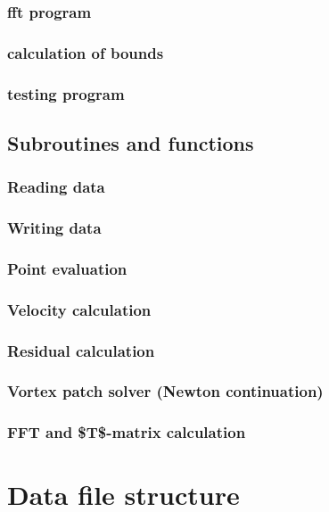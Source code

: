 \documentclass[11pt]{article}
\begin{document}
\subsubsection{fft program}
\label{sec:orga40ca8c}
\subsubsection{calculation of bounds}
\label{sec:orgf1a23b1}
\subsubsection{testing program}
\label{sec:orgcc15a15}
\subsection{Subroutines and functions}
\label{sec:orgf899ab8}
\subsubsection{Reading data}
\label{sec:org1f5f3da}
\subsubsection{Writing data}
\label{sec:orgaa61298}
\subsubsection{Point evaluation}
\label{sec:org59c08b9}
\subsubsection{Velocity calculation}
\label{sec:org4d5ae3b}
\subsubsection{Residual calculation}
\label{sec:org17ab98d}
\subsubsection{Vortex patch solver (Newton continuation)}
\label{sec:org5ec0355}
\subsubsection{FFT and \$T\$-matrix calculation}
\label{sec:org15010ea}
\section{Data file structure}
\label{sec:org18b491a}
\end{document}

